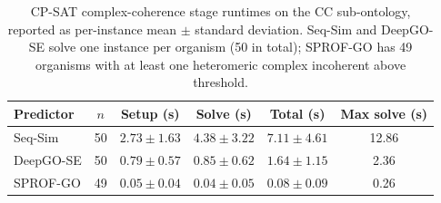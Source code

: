 \begin{table}[!h]
\centering
\caption{CP-SAT complex-coherence stage runtimes on the CC sub-ontology, reported as per-instance mean $\pm$ standard deviation. Seq-Sim and DeepGO-SE solve one instance per organism (50 in total); SPROF-GO has 49 organisms with at least one heteromeric complex incoherent above threshold.}
\label{tab:solver-runtime-cc}
\small
\setlength{\tabcolsep}{4pt}
\begin{tabular}{lccccc}
\toprule
Predictor & $n$ & Setup (s) & Solve (s) & Total (s) & Max solve (s) \\
\midrule
Seq-Sim   & 50 & $2.73 \pm 1.63$ & $4.38 \pm 3.22$ & $7.11 \pm 4.61$ & 12.86 \\
DeepGO-SE & 50 & $0.79 \pm 0.57$ & $0.85 \pm 0.62$ & $1.64 \pm 1.15$ &  2.36 \\
SPROF-GO  & 49 & $0.05 \pm 0.04$ & $0.04 \pm 0.05$ & $0.08 \pm 0.09$ &  0.26 \\
\bottomrule
\end{tabular}
\end{table}
